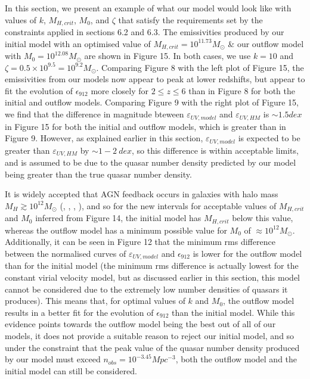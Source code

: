 \documentclass[12pt, twocolumn]{article}%
\begin{document}
In this section, we present an example of what our model would look like with values of $k$, $M_{H,crit}$, $M_0$, and $\zeta$ that satisfy the requirements set by the constraints applied in sections 6.2 and 6.3. The emissivities produced by our initial model with an optimised value of $M_{H,crit}=10^{11.73}M_\odot$ \& our outflow model with $M_0=10^{12.08}M_\odot$ are shown in Figure 15. In both cases, we use $k=10$ and $\zeta=0.5\times10^{9.5}=10^{9.2}M_\odot$. Comparing Figure 8 with the left plot of Figure 15, the emissivities from our models now appear to peak at lower redshifts, but appear to fit the evolution of $\epsilon_{912}$ more closely for $2\leq z\leq6$ than in Figure 8 for both the initial and outflow models. Comparing Figure 9 with the right plot of Figure 15, we find that the difference in magnitude bteween $\varepsilon_{UV,model}$ and $\varepsilon_{UV,HM}$ is $\sim1.5dex$ in Figure 15 for both the initial and outflow models, which is greater than in Figure 9. However, as explained earlier in this section, $\varepsilon_{UV,model}$ is expected to be greater than $\varepsilon_{UV,HM}$ by $\sim1-2\:dex$, so this difference is within acceptable limits, and is assumed to be due to the quasar number density predicted by our model being greater than the true quasar number density.\par

It is widely accepted that AGN feedback occurs in galaxies with halo mass $M_H\gtrsim10^12M_\odot$ (\cite{Ikea}, \cite{Byrne}, \cite{Bassini}, \cite{Somerville}), and so for the new intervals for acceptable values of $M_{H,crit}$ and $M_0$ inferred from Figure 14, the initial model has $M_{H,crit}$ below this value, whereas the outflow model has a minimum possible value for $M_0$ of $\approx10^{12}M_\odot$. Additionally, it can be seen in Figure 12 that the minimum rms difference between the normalised curves of $\varepsilon_{UV,model}$ and $\epsilon_{912}$ is lower for the outflow model than for the initial model (the minimum rms difference is actually lowest for the constant virial velocity model, but as discussed earlier in this section, this model cannot be considered due to the extremely low number densities of quasars it produces). This means that, for optimal values of $k$ and $M_0$, the outflow model results in a better fit for the evolution of $\epsilon_{912}$ than the initial model. While this evidence points towards the outflow model being the best out of all of our models, it does not provide a suitable reason to reject our initial model, and so under the constraint that the peak value of the quasar number density produced by our model must exceed $n_{obs}=10^{-3.45}Mpc^{-3}$, both the outflow model and the initial model can still be considered.
\end{document}
